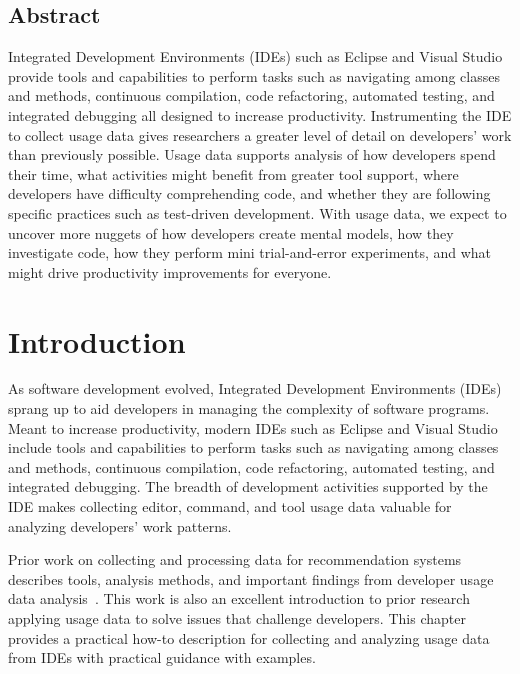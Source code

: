 \begin{center}
\section*{Abstract}
\end{center}
Integrated Development Environments (IDEs) such as Eclipse
and Visual Studio provide tools and capabilities to perform tasks such as navigating among classes and methods, continuous compilation, code refactoring, automated testing, and integrated debugging all designed to increase productivity. 
Instrumenting the IDE to collect usage data gives researchers a greater level of detail on developers' work than previously possible.  Usage data supports analysis of how developers spend their time, what activities might benefit from greater tool support, where developers have difficulty comprehending code, and whether they are following specific practices such as test-driven development.
With usage data, we expect to uncover more nuggets of how developers create mental models, how they investigate code, how they perform mini trial-and-error experiments, and what might drive productivity improvements for everyone.

\section{Introduction}
As software development evolved, Integrated Development Environments (IDEs) sprang up to aid  developers in managing the complexity of software programs.  Meant to increase productivity, modern IDEs such as Eclipse and Visual Studio include tools and capabilities to perform tasks such as navigating among classes and methods, continuous compilation, code refactoring, automated testing, and integrated debugging.  The breadth of development activities supported by the IDE makes collecting editor, command, and tool usage data valuable for analyzing developers' work patterns.  

Prior work on collecting and processing data for recommendation systems describes tools, analysis methods, and important findings from developer usage data analysis~\cite{fritzBookChapter}.  This work is also an excellent introduction to prior research applying usage data to solve issues that challenge developers.  This chapter provides a practical how-to description for collecting and analyzing usage data from IDEs with practical guidance with examples.  

